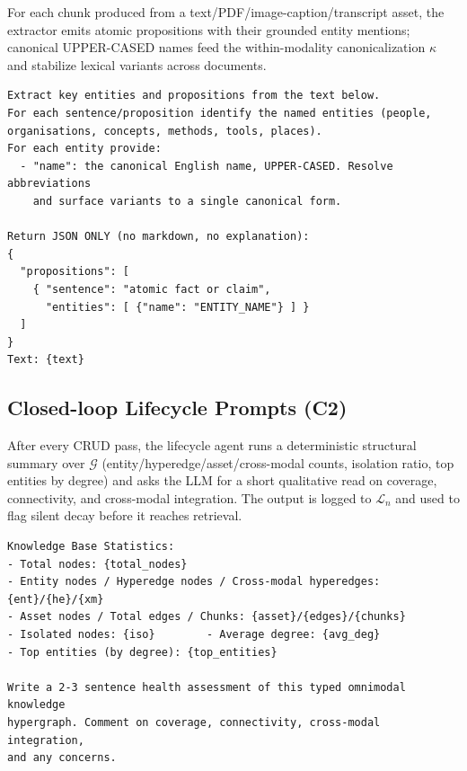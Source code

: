 \documentclass{article}
\begin{document}
 For each chunk produced from a text/PDF/image-caption/transcript asset, the extractor emits atomic propositions with their grounded entity mentions; canonical UPPER-CASED names feed the within-modality canonicalization $\kappa$ and stabilize lexical variants across documents.
\begin{shaded}
\footnotesize
\begin{verbatim}
Extract key entities and propositions from the text below.
For each sentence/proposition identify the named entities (people,
organisations, concepts, methods, tools, places).
For each entity provide:
  - "name": the canonical English name, UPPER-CASED. Resolve abbreviations
    and surface variants to a single canonical form.

Return JSON ONLY (no markdown, no explanation):
{
  "propositions": [
    { "sentence": "atomic fact or claim",
      "entities": [ {"name": "ENTITY_NAME"} ] }
  ]
}
Text: {text}
\end{verbatim}
\end{shaded}

\subsection{Closed-loop Lifecycle Prompts (C2)}

 After every CRUD pass, the lifecycle agent runs a deterministic structural summary over $\mathcal{G}$ (entity/hyperedge/asset/cross-modal counts, isolation ratio, top entities by degree) and asks the LLM for a short qualitative read on coverage, connectivity, and cross-modal integration. The output is logged to $\mathcal{L}_n$ and used to flag silent decay before it reaches retrieval.
\begin{shaded}
\footnotesize
\begin{verbatim}
Knowledge Base Statistics:
- Total nodes: {total_nodes}
- Entity nodes / Hyperedge nodes / Cross-modal hyperedges: {ent}/{he}/{xm}
- Asset nodes / Total edges / Chunks: {asset}/{edges}/{chunks}
- Isolated nodes: {iso}        - Average degree: {avg_deg}
- Top entities (by degree): {top_entities}

Write a 2-3 sentence health assessment of this typed omnimodal knowledge
hypergraph. Comment on coverage, connectivity, cross-modal integration,
and any concerns.
\end{verbatim}
\end{shaded}
\end{document}
